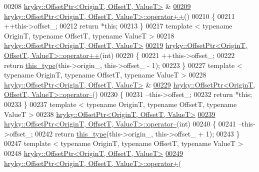 \begin{DoxyCode}
00208 \hyperlink{classhryky_1_1_offset_ptr}{hryky::OffsetPtr<OriginT, OffsetT, ValueT>} & 
\hypertarget{offset__ptr_8h_source_l00209}{}\hyperlink{classhryky_1_1_offset_ptr_ad3475f4a72159db0ff120de8699920ca}{00209} \hyperlink{classhryky_1_1_offset_ptr}{hryky::OffsetPtr<OriginT, OffsetT, ValueT>::operator++}()
00210 \{
00211     ++this->offset\_;
00212     \textcolor{keywordflow}{return} *\textcolor{keyword}{this};
00213 \}
00217 \textcolor{keyword}{template} < \textcolor{keyword}{typename} OriginT, \textcolor{keyword}{typename} OffsetT, \textcolor{keyword}{typename} ValueT >
00218 \hyperlink{classhryky_1_1_offset_ptr}{hryky::OffsetPtr<OriginT, OffsetT, ValueT>} 
\hypertarget{offset__ptr_8h_source_l00219}{}\hyperlink{classhryky_1_1_offset_ptr_a3247e6d6b79211c93e1ab9d38c4ee3df}{00219} \hyperlink{classhryky_1_1_offset_ptr}{hryky::OffsetPtr<OriginT, OffsetT, ValueT>::operator++}(\textcolor{keywordtype}{int})
00220 \{
00221     ++this->offset\_;
00222     \textcolor{keywordflow}{return} \hyperlink{classhryky_1_1_offset_ptr}{this_type}(this->origin\_, this->offset\_ - 1);
00223 \}
00227 \textcolor{keyword}{template} < \textcolor{keyword}{typename} OriginT, \textcolor{keyword}{typename} OffsetT, \textcolor{keyword}{typename} ValueT >
00228 \hyperlink{classhryky_1_1_offset_ptr}{hryky::OffsetPtr<OriginT, OffsetT, ValueT>} & 
\hypertarget{offset__ptr_8h_source_l00229}{}\hyperlink{classhryky_1_1_offset_ptr_a2d2563706f0601ae917b637b672f7370}{00229} \hyperlink{classhryky_1_1_offset_ptr}{hryky::OffsetPtr<OriginT, OffsetT, ValueT>::operator--}()
00230 \{
00231     --this->offset\_;
00232     \textcolor{keywordflow}{return} *\textcolor{keyword}{this};
00233 \}
00237 \textcolor{keyword}{template} < \textcolor{keyword}{typename} OriginT, \textcolor{keyword}{typename} OffsetT, \textcolor{keyword}{typename} ValueT >
00238 \hyperlink{classhryky_1_1_offset_ptr}{hryky::OffsetPtr<OriginT, OffsetT, ValueT>} 
\hypertarget{offset__ptr_8h_source_l00239}{}\hyperlink{classhryky_1_1_offset_ptr_ab15b7a0d274fd3a59326f87bcef843fa}{00239} \hyperlink{classhryky_1_1_offset_ptr}{hryky::OffsetPtr<OriginT, OffsetT, ValueT>::operator--}(\textcolor{keywordtype}{int})
00240 \{
00241     --this->offset\_;
00242     \textcolor{keywordflow}{return} \hyperlink{classhryky_1_1_offset_ptr}{this_type}(this->origin\_, this->offset\_ + 1);
00243 \}
00247 \textcolor{keyword}{template} < \textcolor{keyword}{typename} OriginT, \textcolor{keyword}{typename} OffsetT, \textcolor{keyword}{typename} ValueT >
00248 \hyperlink{classhryky_1_1_offset_ptr}{hryky::OffsetPtr<OriginT, OffsetT, ValueT>} 
\hypertarget{offset__ptr_8h_source_l00249}{}\hyperlink{classhryky_1_1_offset_ptr_a67e7ff2f192f7762ef68cd0cc19f8bf6}{00249} \hyperlink{classhryky_1_1_offset_ptr}{hryky::OffsetPtr<OriginT, OffsetT, ValueT>::operator+}(

\end{DoxyCode}
